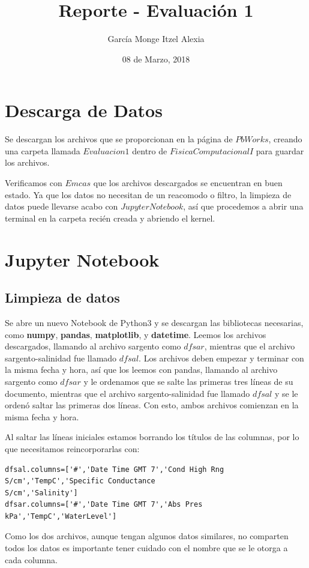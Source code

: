 \documentclass{article}
\title{Reporte - Evaluación 1}
\author{García Monge Itzel Alexia}
\date{08 de Marzo, 2018}
\begin{document}
\maketitle
\section{Descarga de Datos}
Se descargan los archivos que se proporcionan en la página de $PbWorks$, creando una carpeta llamada $Evaluacion1$ dentro de $FisicaComputacionalI$ para guardar los archivos.

Verificamos con $Emcas$ que los archivos descargados se encuentran en buen estado. Ya que los datos no necesitan de un reacomodo o filtro, la limpieza de datos puede llevarse acabo con $Jupyter Notebook$, así que procedemos a abrir una terminal en la carpeta recién creada y abriendo el kernel.

\section{Jupyter Notebook}
\subsection{Limpieza de datos}
Se abre un nuevo Notebook de Python3 y se descargan las bibliotecas necesarias, como \textbf{numpy}, \textbf{pandas}, \textbf{matplotlib}, y \textbf{datetime}. Leemos los archivos descargados, llamando al archivo sargento como $dfsar$, mientras que el archivo sargento-salinidad fue llamado $dfsal$. Los archivos deben empezar y terminar con la misma fecha y hora, así que los leemos con pandas, llamando al archivo sargento como $dfsar$ y le ordenamos que se salte las primeras tres líneas de su documento, mientras que el archivo sargento-salinidad fue llamado $dfsal$ y se le ordenó saltar las primeras dos líneas. Con esto, ambos archivos comienzan en la misma fecha y hora.

Al saltar las líneas iniciales estamos borrando los títulos de las columnas, por lo que necesitamos reincorporarlas con:

\begin{verbatim}
dfsal.columns=['#','Date Time GMT 7','Cond High Rng S/cm','TempC','Specific Conductance 
S/cm','Salinity']
dfsar.columns=['#','Date Time GMT 7','Abs Pres kPa','TempC','WaterLevel']
\end{verbatim}

Como los dos archivos, aunque tengan algunos datos similares, no comparten todos los datos es importante tener cuidado con el nombre que se le otorga a cada columna. 
\end{document}
